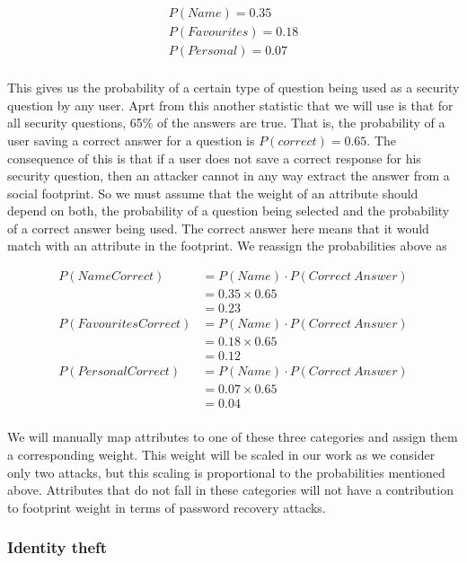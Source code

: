\documentclass[10pt,conference]{IEEEtran}
\begin{document}
\begin{align*}
P(Name) = 0.35 \\
P(Favourites) = 0.18 \\
P(Personal) = 0.07 \\
\end{align*}

This gives us the probability of a certain type of question being used as a security question by any user. Aprt from this another statistic that we will use is that for all security questions, 65\% of the answers are true. That is, the probability of a user saving a correct answer for a question is $ P(correct) = 0.65 $. The consequence of this is that if a user does not save a correct response for his security question, then an attacker cannot in any way extract the answer from a social footprint. So we must assume that the weight of an attribute should depend on both, the probability of a question being selected and the probability of a correct answer being used. The correct answer here means that it would match with an attribute in the footprint. We reassign the probabilities above as 

\begin{align*}
P(Name Correct)       &= P(Name) \cdot P(Correct\ Answer) \\ 
			       &= 0.35 \times 0.65 \\
			       &= 0.23 \\
P(Favourites Correct) &= P(Name) \cdot P(Correct\ Answer) \\ 
			       &= 0.18 \times 0.65 \\
			       &= 0.12 \\
P(Personal Correct)   &= P(Name) \cdot P(Correct\ Answer) \\ 
			       &= 0.07 \times 0.65 \\
			       &= 0.04 \\
\end{align*}

We will manually map attributes to one of these three categories and assign them a corresponding weight. This weight will be scaled in our work as we consider only two attacks, but this scaling is proportional to the probabilities mentioned above. Attributes that do not fall in these categories will not have a contribution to footprint weight in terms of password recovery attacks.

\subsubsection{Identity theft}
\end{document}
